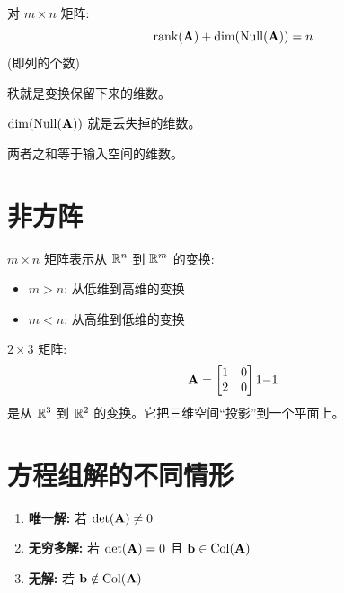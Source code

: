 \begin{theorem}[秩---零化度定理]
对 $m \times n$ 矩阵:
\[
\operatorname{rank}(\mathbf{A}) + \dim(\operatorname{Null}(\mathbf{A})) = n
\]
(即列的个数)
\end{theorem}

\begin{intuition}
秩就是变换保留下来的维数。

$\dim(\operatorname{Null}(\mathbf{A}))$ 就是丢失掉的维数。

两者之和等于输入空间的维数。
\end{intuition}

\section{非方阵}

\begin{definition}[不同维度之间的变换]
$m \times n$ 矩阵表示从 $\mathbb{R}^n$ 到 $\mathbb{R}^m$ 的变换:
\begin{itemize}
    \item $m > n$: 从低维到高维的变换
    \item $m < n$: 从高维到低维的变换
\end{itemize}
\end{definition}

\begin{example}
$2 \times 3$ 矩阵:
\[
\mathbf{A} = \begin{bmatrix} 1 & 0 \\ 2 & 0 \end{bmatrix}{1}{-1}
\]
是从 $\mathbb{R}^3$ 到 $\mathbb{R}^2$ 的变换。它把三维空间``投影''到一个平面上。
\end{example}

\section{方程组解的不同情形}

\begin{theorem}[$\mA\vx = \vb$ 的分析]
\begin{enumerate}
    \item \textbf{唯一解:} 若 $\det(\mathbf{A}) \neq 0$
    \item \textbf{无穷多解:} 若 $\det(\mathbf{A}) = 0$ 且 $\mathbf{b} \in \operatorname{Col}(\mathbf{A})$
    \item \textbf{无解:} 若 $\mathbf{b} \notin \operatorname{Col}(\mathbf{A})$
\end{enumerate}
\end{theorem}

